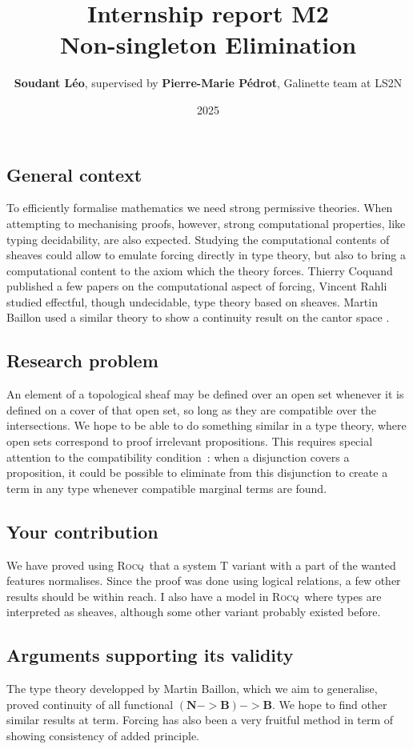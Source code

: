 \documentclass[11pt]{article}
\title{Internship report M2\\  Non-singleton Elimination\\}
\author{\textbf{Soudant L\'eo}, supervised by \textbf{Pierre-Marie P\'edrot}, Galinette team at LS2N}
\date{2025}
\newcommand{\0}{\mathbf{0}}
\newcommand{\1}{\mathbf{1}}
\newcommand{\nat}{\mathbf{N}}
\newcommand{\bool}{\mathbf{B}}
\newcommand{\rocq}{\textsc{Rocq}}
\begin{document}
\maketitle
\newpage


\subsection*{General context}
To efficiently formalise mathematics we need strong permissive theories.
When attempting to mechanising proofs, however, strong computational properties, like typing decidability, are also expected.
Studying the computational contents of sheaves could allow to emulate forcing directly in type theory, but also to bring a computational content to the axiom which the theory forces.
Thierry Coquand published a few papers on the computational aspect of forcing, Vincent Rahli studied effectful, though undecidable, type theory based on sheaves.
Martin Baillon used a similar theory to show a continuity result on the cantor space \cite{baillon:tel-04617881}.
\subsection*{Research problem}
An element of a topological sheaf may be defined over an open set whenever it is defined on a cover of that open set, so long as they are compatible over the intersections.
We hope to be able to do something similar in a type theory, where open sets correspond to proof irrelevant propositions.
This requires special attention to the compatibility condition~: when a disjunction covers a proposition, it could be possible to eliminate from this disjunction to create a term in any type whenever compatible marginal terms are found.
\subsection*{Your contribution}
We have proved using \rocq\ that a system T variant with a part of the wanted features normalises. Since the proof was done using logical relations, a few other results should be within reach. I also have a model in \rocq\ where types are interpreted as sheaves, although some other variant probably existed before.
\subsection*{Arguments supporting its validity}
The type theory developped by Martin Baillon, which we aim to generalise, proved continuity of all functional $(\nat -> \bool) -> \bool$.
We hope to find other similar results at term.
Forcing has also been a very fruitful method in term of showing consistency of added principle.
\end{document}

